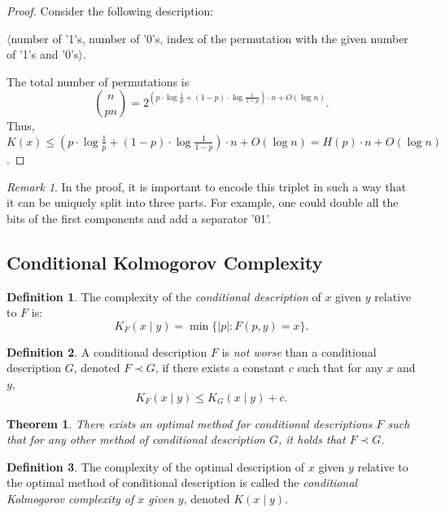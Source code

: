 \documentclass[12pt,sans]{article}
\theoremstyle{definition}
\newtheorem{definition}{Definition}[section]
\theoremstyle{plain}
\newtheorem{theorem}{Theorem}[section]
\theoremstyle{remark}
\newtheorem{remark}{Remark}[section]
\begin{document}
\begin{proof}
    Consider the following description:
    \begin{center}
        $\langle$number of '1's, number of '0's, index of the permutation with the given number of '1's and '0's$\rangle$.
    \end{center}
    The total number of permutations is
    \[
    \binom{n}{pn} = 2^{\left(p \cdot \log \frac{1}{p} + (1-p) \cdot \log \frac{1}{1-p}\right) \cdot n + O(\log n)}.
    \]
    Thus, $K(x) \le \left(p \cdot \log \frac{1}{p} + (1-p) \cdot \log \frac{1}{1-p}\right) \cdot n + O(\log n) = H(p) \cdot n + O(\log n)$.
\end{proof}

\begin{remark}
    In the proof, it is important to encode this triplet in such a way that it can be uniquely split into three parts. For example, one could double all the bits of the first components and add a separator '01'.
\end{remark}

\subsection{Conditional Kolmogorov Complexity}
\begin{definition} The complexity of the \emph{conditional description} of $x$ given $y$ relative to $F$ is:
    \[K_F(x \mid y) = \min\{|p| : F(p,y) = x\}.\]
\end{definition}

\begin{definition} A conditional description $F$ is \emph{not worse} than a conditional description $G$, denoted $F \prec G$, if there exists a constant $c$ such that for any $x$ and $y$,
    \[
    K_F(x \mid y) \le K_G(x \mid y) + c.
    \]
\end{definition}

\begin{theorem}
    There exists an optimal method for conditional descriptions $F$ such that for any other method of conditional description $G$, it holds that $F \prec G$.
\end{theorem}

\begin{definition}
    The complexity of the optimal description of $x$ given $y$ relative to the optimal method of conditional description is called the \emph{conditional Kolmogorov complexity of $x$ given $y$}, denoted $K(x \mid y)$.
\end{definition}
\end{document}
